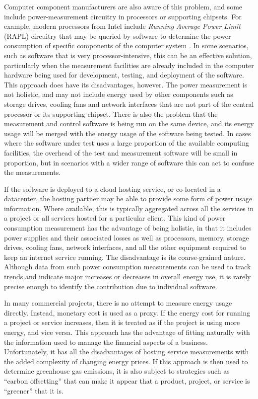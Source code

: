 Computer component manufacturers are also aware of this problem, and some include power-measurement circuitry in processors or supporting chipsets. For example, modern processors from Intel include \emph{Running Average Power Limit} (RAPL) circuitry that may be queried by software to determine the power consumption of specific components of the computer system \citep{Travers2015} \citep{Hahnel2012}. In some scenarios, such as software that is very processor-intensive, this can be an effective solution, particularly when the measurement facilities are already included in the computer hardware being used for development, testing, and deployment of the software. This approach does have its disadvantages, however. The power measurement is not holistic, and may not include energy used by other components such as storage drives, cooling fans and network interfaces that are not part of the central processor or its supporting chipset. There is also the problem that the measurement and control software is being run on the same device, and its energy usage will be merged with the energy usage of the software being tested. In cases where the software under test uses a large proportion of the available computing facilities, the overhead of the test and measurement software will be small in proportion, but in scenarios with a wider range of software this can act to confuse the measurements.

If the software is deployed to a cloud hosting service, or co-located in a datacenter, the hosting partner may be able to provide some form of power usage information. Where available, this is typically aggregated across all the services in a project or all services hosted for a particular client. This kind of power consumption measurement has the advantage of being holistic, in that it includes power supplies and their associated losses as well as processors, memory, storage drives, cooling fans, network interfaces, and all the other equipment required to keep an internet service running. The disadvantage is its coarse-grained nature. Although data from such power consumption measurements can be used to track trends and indicate major increases or decreases in overall energy use, it is rarely precise enough to identify the contribution due to individual software.

In many commercial projects, there is no attempt to measure energy usage directly. Instead, monetary cost is used as a proxy. If the energy cost for running a project or service increases, then it is treated as if the project is using more energy, and vice versa. This approach has the advantage of fitting naturally with the information used to manage the financial aspects of a business. Unfortunately, it has all the disadvantages of hosting service measurements with the added complexity of changing energy prices. If this approach is then used to determine greenhouse gas emissions, it is also subject to strategies such as \enquote{carbon offsetting} that can make it appear that a product, project, or service is \enquote{greener} that it is.

